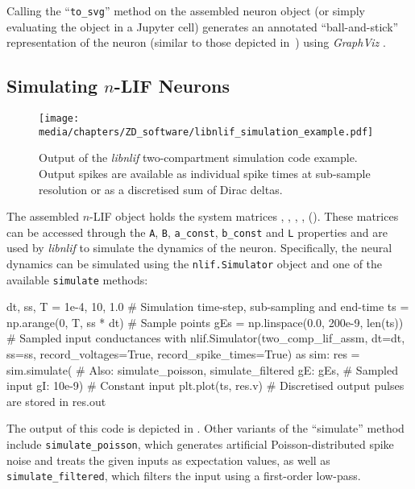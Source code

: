 Calling the \enquote{\texttt{to\_svg}} method on the assembled neuron object (or simply evaluating the object in a Jupyter cell) generates an annotated \enquote{ball-and-stick} representation of the neuron (similar to those depicted in~) using \emph{GraphViz} \citep{ellson2004graphviz}.

\subsection{Simulating $n$-LIF Neurons}

\begin{figure}
	\centering
	\texttt{[image: media/chapters/ZD\_software/libnlif\_simulation\_example.pdf]}
	\label{fig:libnlif_simulation_example}
	\caption[Output of the \emph{libnlif} two-compartment LIF simulation code example]{Output of the \emph{libnlif} two-compartment \LIF simulation code example. Output spikes are available as individual spike times at sub-sample resolution or as a discretised sum of Dirac deltas.}
\end{figure}

The assembled $n$-LIF object holds the system matrices \mnAp, \mnBp, \vnap, \vnbp, \mnL ().
These matrices can be accessed through the \texttt{A}, \texttt{B}, \texttt{a\_const}, \texttt{b\_const} and \texttt{L} properties and are used by \emph{libnlif} to simulate the dynamics of the neuron.
Specifically, the neural dynamics can be simulated using the \texttt{nlif.Simulator} object and one of the available \texttt{simulate} methods:
\begin{pythoncode}
dt, ss, T = 1e-4, 10, 1.0     # Simulation time-step, sub-sampling and end-time
ts = np.arange(0, T, ss * dt) # Sample points
gEs = np.linspace(0.0, 200e-9, len(ts)) # Sampled input conductances
with nlif.Simulator(two_comp_lif_assm, dt=dt, ss=ss,
                    record_voltages=True, record_spike_times=True) as sim:
	res = sim.simulate({      # Also: simulate_poisson, simulate_filtered
		gE: gEs,              # Sampled input
		gI: 10e-9})           # Constant input
plt.plot(ts, res.v)           # Discretised output pulses are stored in res.out
\end{pythoncode}
The output of this code is depicted in .
Other variants of the \enquote{simulate} method include \texttt{simulate\_poisson}, which generates artificial Poisson-distributed spike noise \citep[e.g.,][Section~1.4]{abbott2001theoretical} and treats the given inputs as expectation values, as well as \texttt{simulate\_filtered}, which filters the input using a first-order low-pass.

